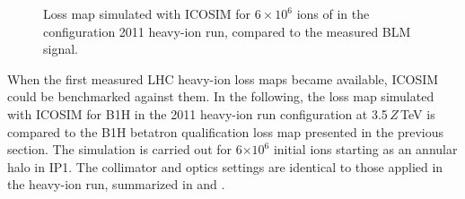 \begin{figure}[htbp]
  \centering
  \caption{Loss map simulated with ICOSIM for $6\times 10^6$ ions of \lead in the configuration 2011 heavy-ion run, compared to the measured BLM signal.}  
  \label{pic:16080803}
  \end{figure} 
When the first measured LHC heavy-ion loss maps became available, ICOSIM could be benchmarked against them. In the following, the loss map simulated with ICOSIM for B1H in the 2011 heavy-ion run configuration at 3.5$\,Z\,$TeV is compared to the B1H betatron qualification loss map presented in the previous section. The simulation is carried out for 6$\times 10^6$ initial \lead ions starting as an annular halo in IP1. The collimator and optics settings are identical to those applied in the heavy-ion run, summarized in  and .


